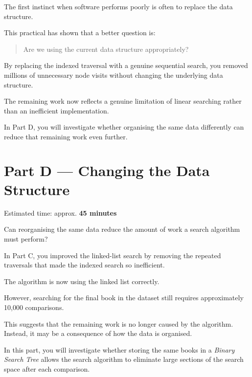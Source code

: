 \documentclass{csc2059practical}
\begin{document}
The first instinct when software performs poorly is often to replace the data
structure.

This practical has shown that a better question is:

\begin{quote}
Are we using the current data structure appropriately?
\end{quote}

By replacing the indexed traversal with a genuine sequential search, you removed
millions of unnecessary node visits without changing the underlying data
structure.

The remaining work now reflects a genuine limitation of linear searching rather
than an inefficient implementation.

In Part D, you will investigate whether organising the same data differently
can reduce that remaining work even further.


\section{Part D --- Changing the Data Structure}

\begin{infobox}
Estimated time: approx. \textbf{45 minutes}
\end{infobox}


\begin{engineeringquestion}
Can reorganising the same data reduce the amount of work a search algorithm
must perform?
\end{engineeringquestion}

In Part C, you improved the linked-list search by removing the repeated
traversals that made the indexed search so inefficient.

The algorithm is now using the linked list correctly.

However, searching for the final book in the dataset still requires
approximately 10,000 comparisons.

This suggests that the remaining work is no longer caused by the algorithm.
Instead, it may be a consequence of how the data is organised.

In this part, you will investigate whether storing the same books in a
\emph{Binary Search Tree} allows the search algorithm to eliminate large
sections of the search space after each comparison.
\end{document}
